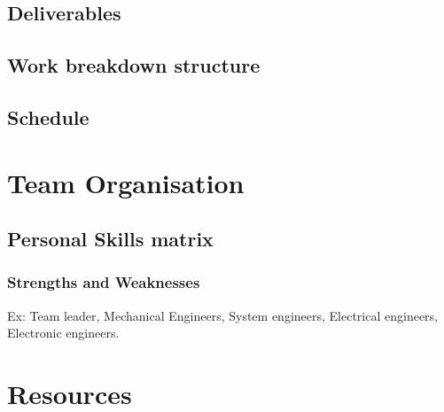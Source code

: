 \documentclass[a4paper,table]{article}
\begin{document}
\subsection{Deliverables}
\subsection{Work breakdown structure}
\subsection{Schedule}
\section{Team Organisation}
\subsection{Personal Skills matrix}
\subsubsection{Strengths and Weaknesses}
Ex: Team leader, Mechanical Engineers, System engineers, Electrical engineers, Electronic engineers.


\section {Resources}
\end{document}
